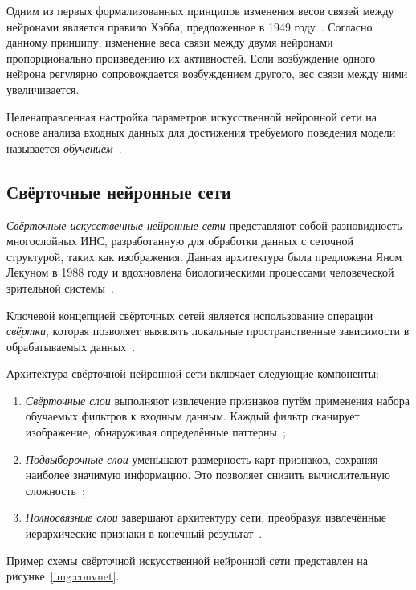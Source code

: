 Одним из первых формализованных принципов изменения весов связей между нейронами является правило Хэбба, предложенное в 1949 году~\cite{hebb}. Согласно данному принципу, изменение веса связи между двумя нейронами пропорционально произведению их активностей. Если возбуждение одного нейрона регулярно сопровождается возбуждением другого, вес связи между ними увеличивается. 

Целенаправленная настройка параметров искусственной нейронной сети на основе анализа входных данных для достижения требуемого поведения модели называется \textit{обучением}~\cite{rosenblatt}.

\subsection{Свёрточные нейронные сети}

\textit{Свёрточные искусственные нейронные сети} представляют собой разновидность многослойных ИНС, разработанную для обработки данных с сеточной структурой, таких как изображения. Данная архитектура была предложена Яном Лекуном в 1988 году и вдохновлена биологическими процессами человеческой зрительной системы~\cite{convnet}.

Ключевой концепцией свёрточных сетей является использование операции \textit{свёртки}, которая позволяет выявлять локальные пространственные зависимости в обрабатываемых данных~\cite{conv}. 

Архитектура свёрточной нейронной сети включает следующие компоненты:
\begin{enumerate}
	\item \textit{Свёрточные слои} выполняют извлечение признаков путём применения набора обучаемых фильтров к входным данным. Каждый фильтр сканирует изображение, обнаруживая определённые паттерны~\cite{conv};
	\item \textit{Подвыборочные слои} уменьшают размерность карт признаков, сохраняя наиболее значимую информацию. Это позволяет снизить вычислительную сложность~\cite{pooling};
	\item \textit{Полносвязные слои} завершают архитектуру сети, преобразуя извлечённые иерархические признаки в конечный результат~\cite{convnet}\cite{rumelhart}.
\end{enumerate}

Пример схемы свёрточной искусственной нейронной сети представлен на рисунке~\ref{img:convnet}.


